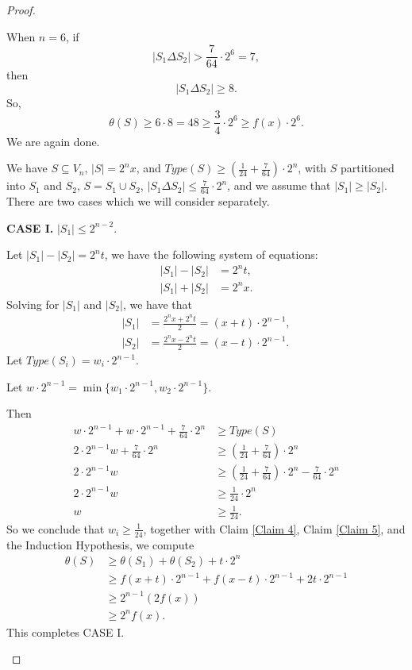 \documentclass[12pt]{ucthesis}
\theoremstyle{plain}
\theoremstyle{definition}
\begin{document}
\begin{proof}
\begin{enumerate}[(1)]
	When $n = 6$, if
	\begin{equation*}
	|S_1 \Delta S_2| > \frac{7}{64} \cdot 2^6 = 7,
	\end{equation*}
	then
	\begin{equation*}
	|S_1 \Delta S_2| \ge 8.
	\end{equation*}
	So,
	\begin{equation*}
	\theta(S) \ge 6 \cdot 8 = 48 \ge \frac{3}{4} \cdot 2^6 \ge f(x) \cdot 2^6.
	\end{equation*}
	We are again done.

	We have $S \subseteq V_n$, $|S| = 2^n x$,
	and $Type(S) \ge (\frac{1}{24} + \frac{7}{64}) \cdot 2^n$,
	with $S$ partitioned into $S_1$ and $S_2$, $S = S_1 \cup S_2$,
	$|S_1 \Delta S_2| \le \frac{7}{64} \cdot 2^n$,
	and we assume that $|S_1| \ge |S_2|$.
	There are two cases which we will consider separately.

	\textbf{CASE I.} $|S_1| \le 2^{n - 2}$.

	Let $|S_1| - |S_2| = 2^n t$, we have the following system of equations:
	\begin{align*}
	|S_1| - |S_2| & = 2^n t, \\
	|S_1| + |S_2| & = 2^n x.
	\end{align*}
	Solving for $|S_1|$ and $|S_2|$, we have that
	\begin{align*}
	|S_1| & = \frac{2^n x + 2^n t}{2} = (x + t) \cdot 2^{n - 1}, \\
	|S_2| & = \frac{2^n x - 2^n t}{2} = (x - t) \cdot 2^{n - 1}.
	\end{align*}
	Let $Type(S_i) = w_i \cdot 2^{n - 1}$.

	Let $w \cdot 2^{n - 1} = \min\{w_1 \cdot 2^{n - 1}, w_2 \cdot 2^{n - 1}\}$.

	Then
	\begin{align*}
	w \cdot 2^{n - 1} + w \cdot 2^{n - 1} + \frac{7}{64} \cdot 2^n & \ge Type(S) \\
	2 \cdot 2^{n - 1} w + \frac{7}{64} \cdot 2^n & \ge (\frac{1}{24} + \frac{7}{64}) \cdot 2^n \\
	2 \cdot 2^{n - 1} w & \ge (\frac{1}{24} + \frac{7}{64}) \cdot 2^n - \frac{7}{64} \cdot 2^n \\
	2 \cdot 2^{n - 1} w & \ge \frac{1}{24} \cdot 2^n \\
	w & \ge \frac{1}{24}.
	\end{align*}
	So we conclude that $w_i \ge \frac{1}{24}$,
	together with Claim \ref{Claim 4}, Claim \ref{Claim 5},
	and the Induction Hypothesis, we compute
	\begin{align*}
	\theta(S)
	& \ge \theta(S_1) + \theta(S_2) + t \cdot 2^n \\
	& \ge f(x + t) \cdot 2^{n - 1} + f(x - t) \cdot 2^{n - 1} + 2 t \cdot 2^{n - 1} \\
	& \ge 2^{n - 1} (2 f(x)) \\
	& \ge 2^n f(x).
	\end{align*}
	This completes CASE I.


\end{enumerate}
\end{proof}
\end{document}
